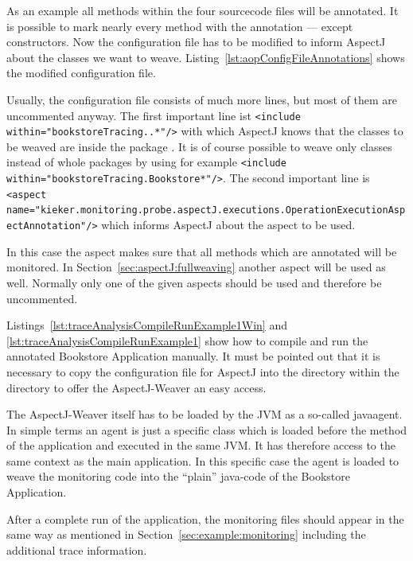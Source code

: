 As an example all methods within the four sourcecode files will be
annotated. It is possible to mark nearly every method with the annotation
--- except constructors. Now the configuration file has to be modified to inform AspectJ about the classes we want to weave. Listing~\ref{lst:aopConfigFileAnnotations} shows the modified configuration file.
\setXMLListing

Usually, the configuration file consists of much more lines, but most of them are uncommented anyway. The first important line ist 
\lstinline$<include within="bookstoreTracing..*"/>$
with which AspectJ knows that the classes to be weaved are inside the package . It is of course possible to weave only classes instead of whole packages by using for example 
\lstinline$<include within="bookstoreTracing.Bookstore*"/>$. The second important line is 
\lstinline$<aspect name="kieker.monitoring.probe.aspectJ.executions.OperationExecutionAspectAnnotation"/>$ which informs AspectJ about the aspect to be used.

In this case the aspect makes sure that all methods which are annotated will be monitored. In Section~\ref{sec:aspectJ:fullweaving} another aspect will be used as well. Normally only one of the given aspects should be used and therefore be uncommented.

Listings~\ref{lst:traceAnalysisCompileRunExample1Win} and \ref{lst:traceAnalysisCompileRunExample1} show how to compile and run the annotated Bookstore Application manually. It must be pointed out that it is necessary to copy the configuration file for AspectJ into the  directory within the  directory to offer the AspectJ-Weaver an easy access.

The AspectJ-Weaver itself has to be loaded by the JVM as a so-called javaagent. In simple terms an agent is just a specific class which is loaded before the  method of the application and executed in the same JVM. It has therefore access to the same context as the main application. In this specific case the agent is loaded to weave the monitoring code into the ``plain'' java-code of the Bookstore Application.

\setBashListing



After a complete run of the application, the monitoring files should appear in %
the same way as mentioned in Section~\ref{sec:example:monitoring} including the %
additional trace information. 

